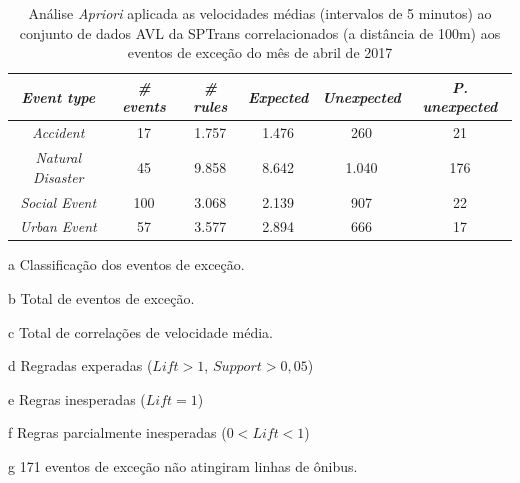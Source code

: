 \documentclass[
	12pt,				%
	oneside,			%
	a4paper,			%
	english,			%
	brazil				%
	]{abntex2ppgsi}
\begin{document}
\begin{apendicesenv}
\begin{table}[!htb]
\centering
\begin{threeparttable}
\caption {Análise \textit{Apriori} aplicada as velocidades médias (intervalos de 5 minutos) ao conjunto de dados AVL da SPTrans correlacionados (a distância de 100m) aos eventos de exceção do mês de abril de 2017}
\label {tab:aprioriFull}
\begin{tabular}{c|c|c|c|c|c}
\hline
\textbf{\textit{Event type}}\tnote{a} & \textbf{\textit{\# events}}\tnote{b} & \textit{\textbf{\# rules}}\tnote{c} & \textbf{\textit{Expected}}\tnote{d} & \textbf{\textit{Unexpected}}\tnote{e} & \textbf{\textit{P. unexpected}}\tnote{f}   \\
\hline
\textit{Accident} & 17 & 1.757 & 1.476 & 260 & 21 \\
\textit{Natural Disaster} & 45 & 9.858 & 8.642 & 1.040 & 176 \\
\textit{Social Event} & 100 & 3.068 & 2.139 & 907 & 22 \\
\textit{Urban Event} & 57 & 3.577 & 2.894 & 666 & 17 \\
\hline
\end{tabular}
\begin{tablenotes}
            \item[a] Classificação dos eventos de exceção.
            \item[b] Total de eventos de exceção.
            \item[c] Total de correlações de velocidade média.
            \item[d] Regradas experadas ($Lift > 1$, $Support > 0,05$)
            \item[e] Regras inesperadas ($Lift = 1$)
            \item[f] Regras parcialmente inesperadas ($0 < Lift < 1$)
            \item[g] 171 eventos de exceção não atingiram linhas de ônibus.
        \end{tablenotes}
\end{threeparttable}
\end{table}


\end{apendicesenv}
\end{document}
